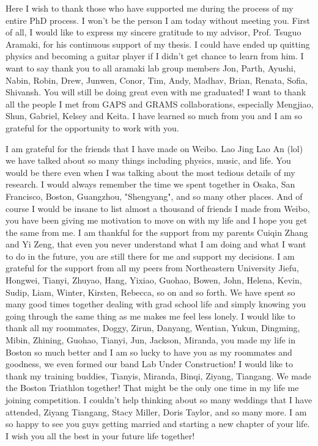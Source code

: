 
\begin{acknowledgements}

Here I wish to thank those who have supported me during the process of my entire PhD process. I won't be the person I am today without meeting you. First of all, I would like to express my sincere gratitude to my advisor, Prof. Tsuguo Aramaki, for his continuous support of my thesis. I could have ended up quitting physics and becoming a guitar player if I didn't get chance to learn from him. I want to say thank you to all aramaki lab group members Jon, Parth, Ayushi, Nabin, Robin, Drew, Junwen, Conor, Tim, Andy, Madhav, Brian, Renata, Sofia, Shivansh. You will still be doing great even with me graduated! I want to thank all the people I met from \ac{GAPS} and \ac{GRAMS} collaborations, especially Mengjiao, Shun, Gabriel, Kelsey and Keita. I have learned so much from you and I am so grateful for the opportunity to work with you.

I am grateful for the friends that I have made on Weibo. Lao Jing Lao An (lol) we have talked about so many things including physics, music, and life. You would be there even when I was talking about the most tedious details of my research. I would always remember the time we spent together in Osaka, San Francisco, Boston, Guangzhou, "Shengyang", and so many other places. And of course I would be insane to list almost a thousand of friends I made from Weibo, you have been giving me motivation to move on with my life and I hope you get the same from me. I am thankful for the support from my parents Cuiqin Zhang and Yi Zeng, that even you never understand what I am doing and what I want to do in the future, you are still there for me and support my decisions. I am grateful for the support from all my peers from Northeastern University Jiefu, Hongwei, Tianyi, Zhuyao, Hang, Yixiao, Guohao, Bowen, John, Helena, Kevin, Sudip, Liam, Winter, Kirsten, Rebecca, so on and so forth. We have spent so many good times together dealing with grad school life and simply knowing you going through the same thing as me makes me feel less lonely. I would like to thank all my roommates, Doggy, Zirun, Danyang, Wentian, Yukun, Dingming, Mibin, Zhining, Guohao, Tianyi, Jun, Jackson, Miranda, you made my life in Boston so much better and I am so lucky to have you as my roommates and goodness, we even formed our band Lab Under Construction! I would like to thank my training buddies, Tianyis, Miranda, Binqi, Ziyang, Tiangang. We made the Boston Triathlon together! That might be the only one time in my life me joining competition. I couldn't help thinking about so many weddings that I have attended, Ziyang Tiangang, Stacy Miller, Doris Taylor, and so many more. I am so happy to see you guys getting married and starting a new chapter of your life. I wish you all the best in your future life together! 


\end{acknowledgements}
